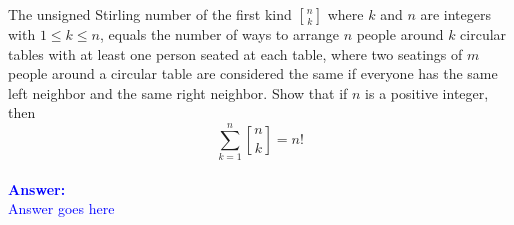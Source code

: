 \item{}
The unsigned Stirling number of the first kind ${n \brack k}$ where $k$ and $n$
are integers with $1 \le k \le n$, equals the number of ways to arrange $n$
people around $k$ circular tables with at least one person seated at each
table, where two seatings of $m$ people around a circular table are considered
the same if everyone has the same left neighbor and the same right neighbor.
\parend
Show that if $n$ is a positive integer, then $$\sum_{k=1}^n{n\brack k}=n!$$
\ \\[12pt]
\ifanswers
\textcolor{blue}{
\textbf{Answer:}\\[6pt]
Answer goes here
}
\newpage
\fi
